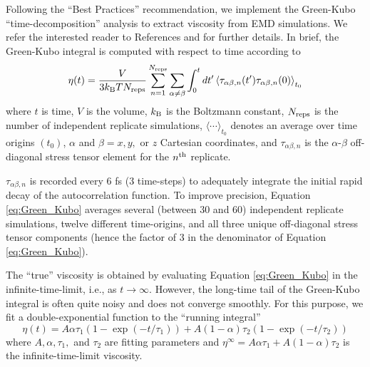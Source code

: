 \documentclass[preprint,review,12pt]{elsarticle}
\begin{document}
	Following the ``Best Practices'' recommendation, we implement the Green-Kubo ``time-decomposition'' analysis to extract viscosity from EMD simulations. We refer the interested reader to References  and  for further details. In brief, the Green-Kubo integral is computed with respect to time according to
	\begin{equation} \label{eq:Green_Kubo}
	\eta(t) = \frac{V}{3 k_{\rm B} T N_{\rm reps}} \sum_{n=1}^{N_{\rm reps}} \sum_{\alpha \ne \beta} \int_{0}^{t}dt'\left\langle \tau_{\alpha\beta,n}(t') \tau_{\alpha\beta,n}(0)\right\rangle_{t_0}
	\end{equation} 
	where $t$ is time, $V$ is the volume, $k_{\rm B}$ is the Boltzmann constant, $N_{\rm reps}$ is the number of independent replicate simulations, $\langle \cdots \rangle_{t_0}$ denotes an average over time origins $(t_0)$, $\alpha$ and $\beta = x, y, $ or $z$ Cartesian coordinates, and $\tau_{\alpha\beta,n}$ is the $\alpha$-$\beta$ off-diagonal stress tensor element for the $n^{\rm th}$ replicate. 
	
	$\tau_{\alpha\beta,n}$ is recorded every 6 fs (3 time-steps) to adequately integrate the initial rapid decay of the autocorrelation function. To improve precision, Equation \ref{eq:Green_Kubo} averages several (between 30 and 60) independent replicate simulations, twelve different time-origins, and all three unique off-diagonal stress tensor components (hence the factor of 3 in the denominator of Equation \ref{eq:Green_Kubo}).
	
	
	The ``true'' viscosity is obtained by evaluating Equation \ref{eq:Green_Kubo} in the infinite-time-limit, i.e., as $t \rightarrow \infty$. However, the long-time tail of the Green-Kubo integral is often quite noisy and does not converge smoothly. For this purpose, we fit a double-exponential function to the ``running integral''
	\begin{equation} \label{eq: Double exponential}
	\eta(t) = A \alpha \tau_1 \left(1-\exp{(-t/\tau_1)}\right) + A (1-\alpha) \tau_2 \left(1-\exp{(-t/\tau_2)}\right)
	\end{equation}
	where $A, \alpha, \tau_1, $ and $\tau_2$ are fitting parameters and $\eta^\infty = A \alpha \tau_1 + A (1-\alpha) \tau_2$ is the infinite-time-limit viscosity. 
	
\end{document}
